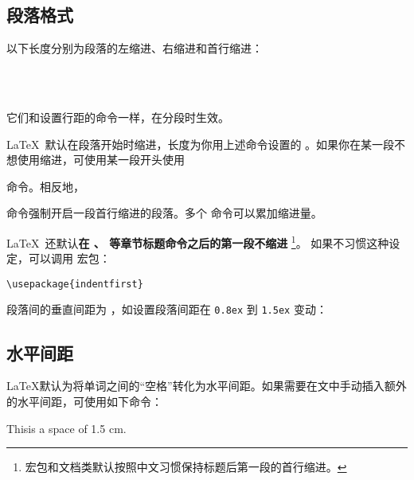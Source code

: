 \subsection{段落格式}\label{subsec:par-shape}

以下长度分别为段落的左缩进、右缩进和首行缩进：
\begin{command}
\marg*{20pt}  \\
\marg*{20pt} \\
\marg*{2em}
\end{command}

它们和设置行距的命令一样，在分段时生效。

\LaTeX\ 默认在段落开始时缩进，长度为你用上述命令设置的 。如果你在某一段不想使用缩进，可使用某一段开头使用
\begin{command}
\end{command}
命令。相反地，
\begin{command}
\end{command}
命令强制开启一段首行缩进的段落。多个  命令可以累加缩进量。

\LaTeX\ 还默认\textbf{在 、 等章节标题命令之后的第一段不缩进}%
\footnote{ 宏包和文档类默认按照中文习惯保持标题后第一段的首行缩进。}。
如果不习惯这种设定，可以调用  宏包：
\begin{verbatim}
\usepackage{indentfirst}
\end{verbatim}

段落间的垂直间距为 ，如设置段落间距在 \texttt{0.8ex} 到 \texttt{1.5ex} 变动：
\begin{command}
\end{command}

\subsection{水平间距}\label{subsec:hspace}

\LaTeX 默认为将单词之间的“空格”转化为水平间距。如果需要在文中手动插入额外的水平间距，可使用如下命令：
\begin{command}
\end{command}
\begin{example}
This\hspace{1.5cm}is a space
of 1.5 cm.
\end{example}

